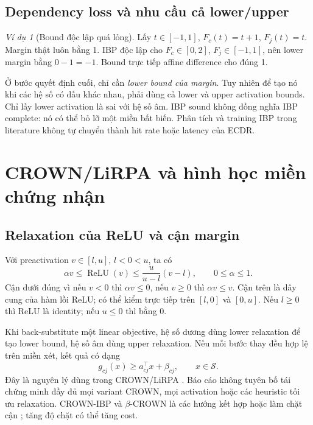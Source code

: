 \documentclass[11pt,a4paper]{article}
\newcommand{\relu}{\operatorname{ReLU}}
\newcommand{\Sset}{\mathcal S}
\theoremstyle{remark}
\newtheorem{example}[definition]{Ví dụ}
\begin{document}
\subsection{Dependency loss và nhu cầu cả lower/upper}
\begin{example}[Bound độc lập quá lỏng]
Lấy $t\in[-1,1]$, $F_c(t)=t+1$, $F_j(t)=t$. Margin thật luôn bằng 1.
IBP độc lập cho $F_c\in[0,2]$, $F_j\in[-1,1]$, nên lower margin bằng
$0-1=-1$. Bound trực tiếp affine difference cho đúng 1.
\end{example}
Ở bước quyết định cuối, chỉ cần \emph{lower bound của margin}. Tuy nhiên
để tạo nó khi các hệ số có dấu khác nhau, phải dùng cả lower và upper
activation bounds. Chỉ lấy lower activation là sai với hệ số âm.
IBP sound không đồng nghĩa IBP complete: nó có thể bỏ lỡ một miền bất biến.
Phân tích và training IBP trong literature \cite{ibp} không tự chuyển thành
hit rate hoặc latency của ECDR.

\section{CROWN/LiRPA và hình học miền chứng nhận}
\subsection{Relaxation của ReLU và cận margin}
Với preactivation $v\in[l,u]$, $l<0<u$, ta có
\begin{equation}
 \alpha v\le\relu(v)\le\frac{u}{u-l}(v-l),\qquad0\le\alpha\le1.
 \label{eq:relu-relax}
\end{equation}
Cận dưới đúng vì nếu $v<0$ thì $\alpha v\le0$, nếu $v\ge0$ thì
$\alpha v\le v$. Cận trên là dây cung của hàm lồi ReLU; có thể kiểm trực
tiếp trên $[l,0]$ và $[0,u]$. Nếu $l\ge0$ thì ReLU là identity; nếu
$u\le0$ thì bằng 0.

Khi back-substitute một linear objective, hệ số dương dùng lower
relaxation để tạo lower bound, hệ số âm dùng upper relaxation. Nếu mỗi
bước thay đều hợp lệ trên miền xét, kết quả có dạng
\begin{equation}
 g_{cj}(x)\ge a_{cj}^\top x+\beta_{cj},\qquad x\in\Sset.
 \label{eq:affine-lower}
\end{equation}
Đây là nguyên lý dùng trong CROWN/LiRPA \cite{crown,lirpa}. Báo cáo không
tuyên bố tái chứng minh đầy đủ mọi variant CROWN, mọi activation hoặc các
heuristic tối ưu relaxation. CROWN-IBP và $\beta$-CROWN là các hướng kết hợp
hoặc làm chặt cận \cite{crownibp,betacrown}; tăng độ chặt có thể tăng cost.
\end{document}
